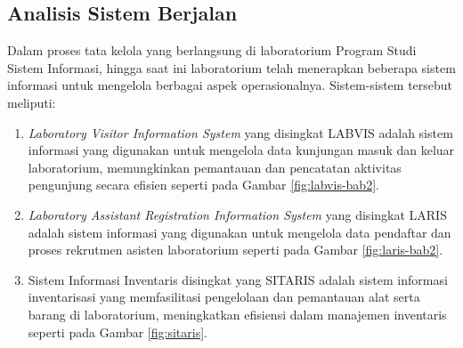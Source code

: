 \subsection{Analisis Sistem Berjalan}
Dalam proses tata kelola yang berlangsung di laboratorium Program Studi Sistem Informasi, hingga saat ini laboratorium telah menerapkan beberapa sistem informasi untuk mengelola berbagai aspek operasionalnya. Sistem-sistem tersebut meliputi:

\begin{enumerate}
	\item \textit{Laboratory Visitor Information System} yang disingkat LABVIS adalah sistem informasi yang digunakan untuk mengelola data kunjungan masuk dan keluar laboratorium, memungkinkan pemantauan dan pencatatan aktivitas pengunjung secara efisien seperti pada Gambar \ref{fig:labvis-bab2}.

	\item \textit{Laboratory Assistant Registration Information System} yang disingkat LARIS adalah sistem informasi yang digunakan untuk mengelola data pendaftar dan proses rekrutmen asisten laboratorium seperti pada Gambar \ref{fig:laris-bab2}.

	\item Sistem Informasi Inventaris disingkat yang SITARIS adalah sistem informasi inventarisasi yang memfasilitasi pengelolaan dan pemantauan alat serta barang di laboratorium, meningkatkan efisiensi dalam manajemen inventaris seperti pada Gambar \ref{fig:sitaris}.
\end{enumerate}

